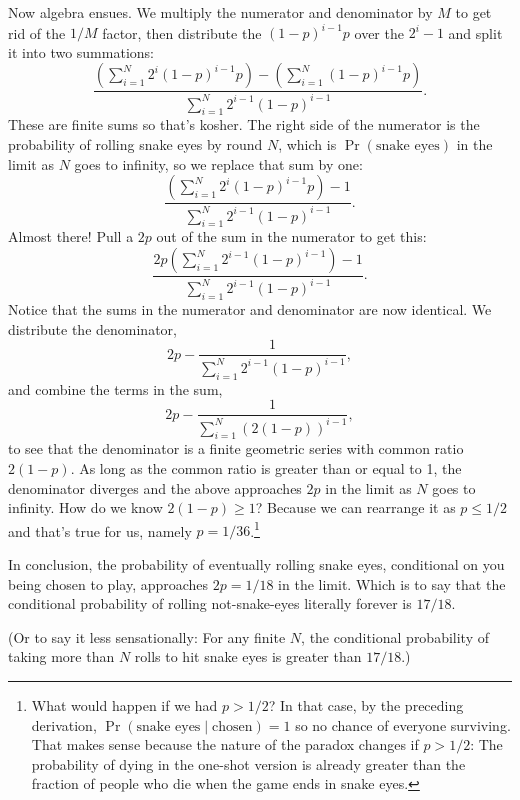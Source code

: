\documentclass[article,twocolumn]{memoir}
\begin{document}
Now algebra ensues.
We multiply the numerator and denominator by $M$ to get rid of the $1/M$ factor, 
then distribute the $(1-p)^{i-1}p$ over the $2^i-1$ and split it into two summations:
$$\dfrac{
\left(\sum\limits_{i=1}^{N}2^i(1-p)^{i-1}p\right) -
\left(\sum\limits_{i=1}^{N}(1-p)^{i-1}p \right)
}{\sum\limits_{i=1}^{N} 2^{i-1}(1-p)^{i-1}}.
$$
These are finite sums so that's kosher.
The right side of the numerator is the probability of rolling snake eyes by round $N$, which is $\Pr(\text{snake eyes})$ in the limit as $N$ goes to infinity, so we replace that sum by one:
$$\dfrac{
\left(\sum\limits_{i=1}^{N}2^i(1-p)^{i-1}p\right) - 1
}{\sum\limits_{i=1}^{N}2^{i-1}(1-p)^{i-1}}.
$$
Almost there!
Pull a $2p$ out of the sum in the numerator to get this:
$$\dfrac{
2p\left(\sum\limits_{i=1}^{N}2^{i-1}(1-p)^{i-1}\right) - 1
}{\sum\limits_{i=1}^{N}2^{i-1}(1-p)^{i-1}}.
$$
Notice that the sums in the numerator and denominator are now identical.
We distribute the denominator,
$$2p - \dfrac{1} 
{\sum\limits_{i=1}^{N}2^{i-1}(1-p)^{i-1}},
$$
and combine the terms in the sum,
$$2p - \dfrac{1} 
{\sum\limits_{i=1}^{N}\left(2(1-p)\right)^{i-1}},
$$
to see that the denominator is a finite geometric series with common ratio $2(1-p)$.
As long as the common ratio is greater than or equal to 1, 
the denominator diverges and the above approaches $2p$ in the limit as $N$ goes to infinity.
How do we know $2(1-p) \geq 1$?
Because we can rearrange it as $p\leq 1/2$ and that's true for us, namely $p=1/36$.\footnote{
What would happen if we had $p>1/2$?
In that case, by the preceding derivation, $\Pr(\text{snake eyes} \mid \text{chosen}) = 1$ so no chance of everyone surviving.
That makes sense because the nature of the paradox changes if $p>1/2$:
The probability of dying in the one-shot version is already greater than the fraction of people who die when the game ends in snake eyes.}

In conclusion, the probability of eventually rolling snake eyes, conditional on you being chosen to play, approaches $2p=1/18$ in the limit.
Which is to say that the conditional probability of rolling not-snake-eyes literally forever is $17/18$.

(Or to say it less sensationally: For any finite $N$, the conditional probability of taking more than $N$ rolls to hit snake eyes is greater than $17/18$.)
\end{document}
